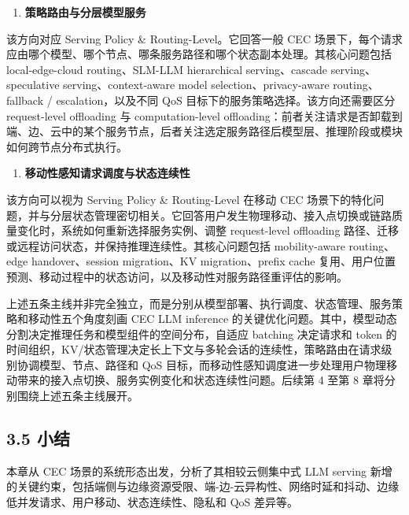 \documentclass[a4paper,twocolumn,10pt]{ctexart}
\begin{document}
\begin{enumerate}
\item \textbf{策略路由与分层模型服务}

\end{enumerate}
该方向对应 Serving Policy \& Routing-Level。它回答一般 CEC 场景下，每个请求应由哪个模型、哪个节点、哪条服务路径和哪个状态副本处理。其核心问题包括 local-edge-cloud routing、SLM-LLM hierarchical serving、cascade serving、speculative serving、context-aware model selection、privacy-aware routing、fallback / escalation，以及不同 QoS 目标下的服务策略选择。该方向还需要区分 request-level offloading 与 computation-level offloading：前者关注请求是否卸载到端、边、云中的某个服务节点，后者关注选定服务路径后模型层、推理阶段或模块如何跨节点分布式执行。


\begin{enumerate}
\item \textbf{移动性感知请求调度与状态连续性}

\end{enumerate}
该方向可以视为 Serving Policy \& Routing-Level 在移动 CEC 场景下的特化问题，并与分层状态管理密切相关。它回答用户发生物理移动、接入点切换或链路质量变化时，系统如何重新选择服务实例、调整 request-level offloading 路径、迁移或远程访问状态，并保持推理连续性。其核心问题包括 mobility-aware routing、edge handover、session migration、KV migration、prefix cache 复用、用户位置预测、移动过程中的状态访问，以及移动性对服务路径重评估的影响。




上述五条主线并非完全独立，而是分别从模型部署、执行调度、状态管理、服务策略和移动性五个角度刻画 CEC LLM inference 的关键优化问题。其中，模型动态分割决定推理任务和模型组件的空间分布，自适应 batching 决定请求和 token 的时间组织，KV/状态管理决定长上下文与多轮会话的连续性，策略路由在请求级别协调模型、节点、路径和 QoS 目标，而移动性感知调度进一步处理用户物理移动带来的接入点切换、服务实例变化和状态连续性问题。后续第 4 至第 8 章将分别围绕上述五条主线展开。








\subsection{3.5 小结}



本章从 CEC 场景的系统形态出发，分析了其相较云侧集中式 LLM serving 新增的关键约束，包括端侧与边缘资源受限、端-边-云异构性、网络时延和抖动、边缘低并发请求、用户移动、状态连续性、隐私和 QoS 差异等。
\end{document}
